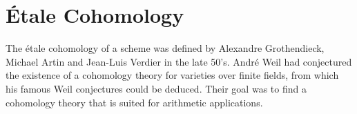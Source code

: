 \section{\'Etale Cohomology}
The \'etale cohomology of a scheme was defined by Alexandre Grothendieck, Michael Artin and Jean-Luis Verdier in the late 50's. Andr\'e Weil had conjectured the existence of a cohomology theory for varieties over finite fields, from which his famous Weil conjectures could be deduced.
Their goal was to find a cohomology theory that is suited for arithmetic applications.
